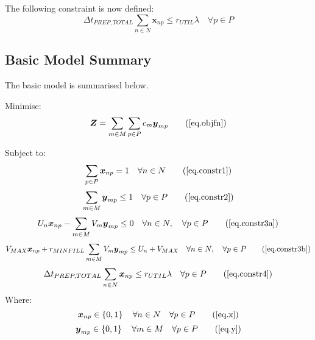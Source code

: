The following constraint is now defined:
\begin{equation}
    \Delta t_{PREP,TOTAL} \sum_{n \in N} \boldsymbol{x}_{np} \le r_{UTIL}
    \lambda \quad \forall p \in P
    \label{eq.constr4}
\end{equation}

\subsection{Basic Model Summary}\label{SS.basicsummary}

The basic model is summarised below.

Minimise:
\begin{equation}
    \boldsymbol{Z} = \sum_{m \in M} \sum_{p \in P} c_m \boldsymbol{y}_{mp}
    \tag{\ref{eq.objfn}}
\end{equation}

Subject to:
\begin{equation}
    \sum_{p \in P} \boldsymbol{x}_{np} = 1 \quad \forall n \in N
    \tag{\ref{eq.constr1}}
\end{equation}
\begin{equation}
    \sum_{m \in M} \boldsymbol{y}_{mp} \le 1 \quad \forall p \in P
    \tag{\ref{eq.constr2}}
\end{equation}
\begin{equation}
    U_{n} \boldsymbol{x}_{np} - \sum_{m \in M} V_{m} \boldsymbol{y}_{mp} \le 0
    \quad \forall n \in N, \quad \forall p \in P
    \tag{\ref{eq.constr3a}}
\end{equation}
\begin{equation}
    V_{MAX} \boldsymbol{x}_{np} + r_{MINFILL} \sum_{m \in M} V_{m}
    \boldsymbol{y}_{mp} \le U_{n} + V_{MAX} \quad \forall n \in N, \quad
    \forall p \in P
    \tag{\ref{eq.constr3b}}
\end{equation}
\begin{equation}
    \Delta t_{PREP,TOTAL} \sum_{n \in N} \boldsymbol{x}_{np} \le r_{UTIL}
    \lambda \quad \forall p \in P
    \tag{\ref{eq.constr4}}
\end{equation}
Where:
\begin{equation}
    \boldsymbol{x}_{np} \in \left\{ 0, 1 \right\} \quad \forall n \in N \quad
    \forall p \in P
    \tag{\ref{eq.x}}
\end{equation}
\begin{equation}
    \boldsymbol{y}_{mp} \in \left\{ 0, 1 \right\} \quad \forall m \in M \quad
    \forall p \in P
    \tag{\ref{eq.y}}
\end{equation}

